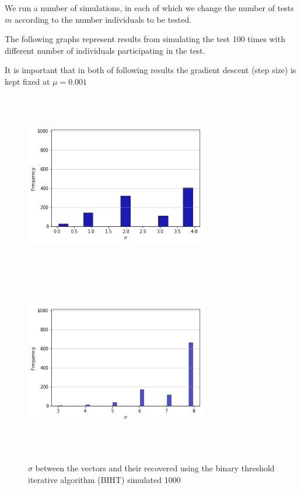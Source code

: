 We run a number of simulations, in each of which we change the number of tests $ m $ according to the number individuals to be tested. 

The following graphs represent results from simulating the test 100 times with different number of individuals participating in the test.  

It is important that in both of following results the gradient descent (step size)  is kept fixed at $ \mu = 0.001 $

 \begin{figure}[H]
	\includegraphics[height=8cm, width=8cm]{images/sigma_biht}
	\includegraphics[height=8cm, width=8cm]{images/sigma_512}
	\caption{$ \sigma $ between the vectors and their recovered using the binary threshold iterative algorithm (BIHT) simulated 1000}
	\label{sigma}
\end{figure}
